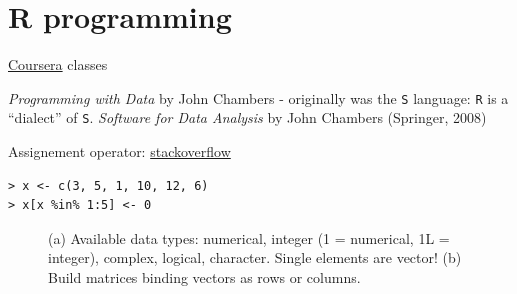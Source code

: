 \chapter{R programming}

\href{https://class.coursera.org/rprog-016/}{Coursera} classes

{\it Programming with Data} by John Chambers - originally was the \texttt{S} language: \texttt{R} is a ``dialect'' of \texttt{S}. 
{\it Software for Data Analysis} by John Chambers (Springer, 2008)

Assignement operator: \href{http://stackoverflow.com/questions/1741820/assignment-operators-in-r-and}{stackoverflow}


\begin{lstlisting}
> x <- c(3, 5, 1, 10, 12, 6)
> x[x %in% 1:5] <- 0
\end{lstlisting}


\begin{figure}[htb]\begin{center}
\caption{(a) Available data types: numerical, integer (1 = numerical, 1L = integer), complex, logical, character. Single elements are vector! (b) Build matrices binding
vectors as rows or columns.}
\end{center}\end{figure}



